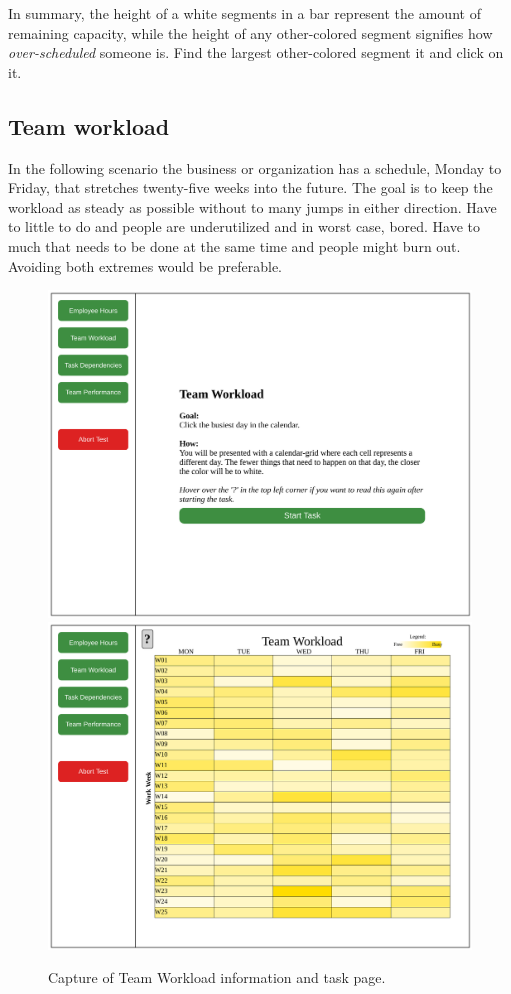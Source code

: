 {    In summary, the height of a white segments in a bar represent the
    amount of remaining capacity, while the height of any other-colored
    segment signifies how \textit{over-scheduled} someone is. Find the
    largest other-colored segment it and click on it.

  \newpage
  \subsection{Team workload}

    \textit{\ideaTwo}

    In the following scenario the business or organization has a schedule,
    Monday to Friday, that stretches twenty-five weeks into the future. The
    goal is to keep the workload as steady as possible without to many
    jumps in either direction. Have to little to do and people are
    underutilized and in worst case, bored. Have to much that needs to be
    done at the same time and people might burn out. Avoiding both
    extremes would be preferable.

    \begin{figure}[h!]
      \centering
      \includegraphics[width=.49\textwidth]{figures/captures/webapp_team_workload_info.pdf}
      \includegraphics[width=.49\textwidth]{figures/captures/webapp_team_workload_task.pdf}
      \caption{Capture of Team Workload information and task page.}
    \end{figure}

}
